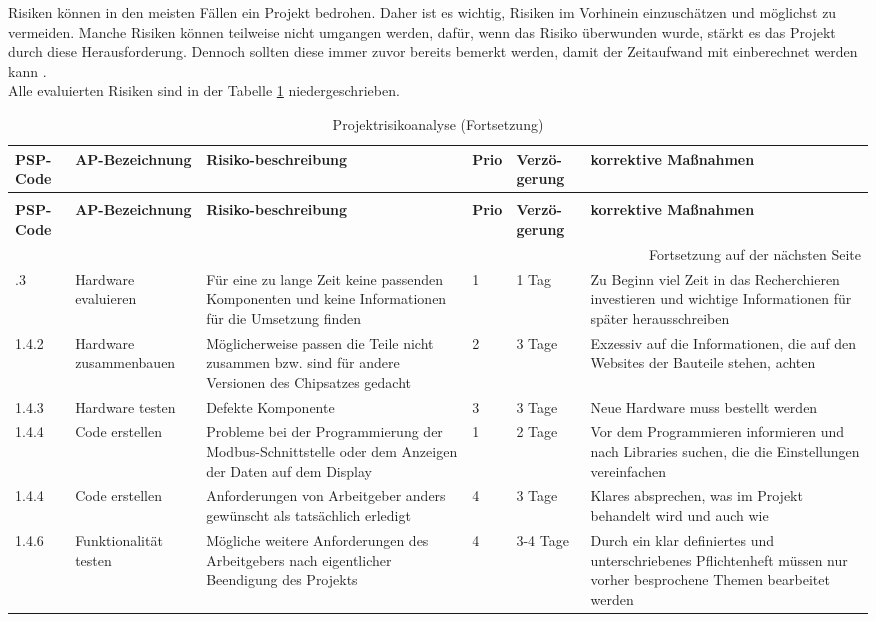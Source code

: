 Risiken können in den meisten Fällen ein Projekt bedrohen. Daher ist es wichtig, Risiken im Vorhinein einzuschätzen und möglichst zu vermeiden. Manche Risiken können teilweise nicht umgangen werden, dafür, wenn das Risiko überwunden wurde, stärkt es das Projekt durch diese Herausforderung. Dennoch sollten diese immer zuvor bereits bemerkt werden, damit der Zeitaufwand mit einberechnet werden kann \cite[vgl.][]{timetrackapp:2021}. \\
Alle evaluierten Risiken sind in der Tabelle \ref{tab:risikoanalyse} niedergeschrieben.

\begin{longtable}{p{} | p{} | p{} | p{} | p{} | p{}}
	\caption{Projektrisikoanalyse}
	\label{tab:risikoanalyse}
	\\ \toprule
	\textbf{PSP-Code} & \textbf{AP-Bezeichnung} & \textbf{Risiko-beschreibung} & \textbf{Prio} & \textbf{Verzö-gerung} & \textbf{korrektive Maßnahmen}
	\\ \midrule
	\endfirsthead
	\caption{Projektrisikoanalyse (Fortsetzung)}
	\\ \toprule
		\textbf{PSP-Code} & \textbf{AP-Bezeichnung} & \textbf{Risiko-beschreibung} & \textbf{Prio} & \textbf{Verzö-gerung} & \textbf{korrektive Maßnahmen}
	\\ \midrule
	\endhead
	\midrule
	\multicolumn{6}{r}{{Fortsetzung auf  der nächsten Seite}} 
	\\ \bottomrule
	\endfoot
	\bottomrule
	\endlastfoot
	1.3.3 & Hardware evaluieren &  Für eine zu lange Zeit keine passenden Komponenten und keine Informationen für die Umsetzung finden & 1 & 1 Tag & Zu Beginn viel Zeit in das Recherchieren investieren und wichtige Informationen für später herausschreiben \\ \midrule
	1.4.2 & Hardware zusammenbauen & Möglicherweise passen die Teile nicht zusammen bzw. sind für andere Versionen des Chipsatzes gedacht & 2 & 3 Tage & Exzessiv auf die Informationen, die auf den Websites der Bauteile stehen, achten  \\ \midrule
	1.4.3 & Hardware testen & Defekte Komponente & 3 & 3 Tage & Neue Hardware muss bestellt werden \\ 
	1.4.4 & Code erstellen & Probleme bei der Programmierung der Modbus-Schnittstelle oder dem Anzeigen der Daten auf dem Display & 1 & 2 Tage & Vor dem Programmieren informieren und nach Libraries suchen, die die Einstellungen vereinfachen \\ \midrule
	1.4.4 & Code erstellen & Anforderungen von Arbeitgeber anders gewünscht als tatsächlich erledigt & 4 & 3 Tage & Klares absprechen, was im Projekt behandelt wird und auch wie \\ \midrule
	1.4.6 & Funktionalität testen & Mögliche weitere Anforderungen des Arbeitgebers nach eigentlicher Beendigung des Projekts  & 4 & 3-4 Tage & Durch ein klar definiertes und unterschriebenes Pflichtenheft müssen nur vorher besprochene Themen bearbeitet werden \\
\end{longtable}